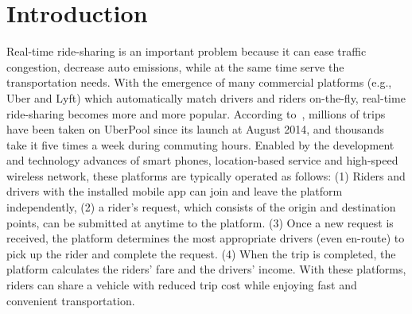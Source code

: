 \section{Introduction}

%	
%	
%	
%	
%	


Real-time ride-sharing is an important problem because it can ease traffic congestion, decrease auto emissions, while at the same time serve the transportation needs. With the emergence of many commercial platforms (e.g., Uber and Lyft) which automatically match drivers and riders on-the-fly, real-time ride-sharing becomes more and more popular. According to~\cite{uberpool}, millions of trips have been taken on UberPool since its launch at August 2014, and thousands take it five times a week during commuting hours. Enabled by the development and technology advances of smart phones, location-based service and high-speed wireless network, these platforms are typically operated as follows: (1) Riders and drivers with the installed mobile app can join and leave the platform independently, (2) a rider's request, which consists of the origin and destination points, can be submitted at anytime to the platform. (3) Once a new request is received, the platform determines the most appropriate drivers (even en-route) to pick up the rider and complete the request. (4) When the trip is completed, the platform calculates the riders' fare and the drivers' income. With these platforms, riders can share a vehicle with reduced trip cost while enjoying fast and convenient transportation.

